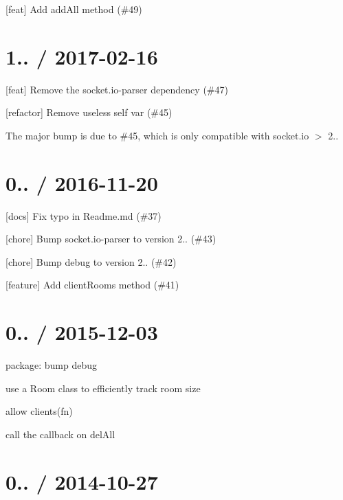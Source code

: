 
\begin{DoxyItemize}
\item \mbox{[}feat\mbox{]} Add add\+All method (\#49)
\end{DoxyItemize}

\section*{1.. / 2017-\/02-\/16 }


\begin{DoxyItemize}
\item \mbox{[}feat\mbox{]} Remove the socket.\+io-\/parser dependency (\#47)
\item \mbox{[}refactor\mbox{]} Remove useless self var (\#45)
\end{DoxyItemize}

The major bump is due to \#45, which is only compatible with socket.\+io $>$ 2..

\section*{0.. / 2016-\/11-\/20 }


\begin{DoxyItemize}
\item \mbox{[}docs\mbox{]} Fix typo in Readme.\+md (\#37)
\item \mbox{[}chore\mbox{]} Bump socket.\+io-\/parser to version 2.. (\#43)
\item \mbox{[}chore\mbox{]} Bump debug to version 2.. (\#42)
\item \mbox{[}feature\mbox{]} Add client\+Rooms method (\#41)
\end{DoxyItemize}

\section*{0.. / 2015-\/12-\/03 }


\begin{DoxyItemize}
\item package\+: bump {\ttfamily debug}
\item use a {\ttfamily Room} class to efficiently track room size
\item allow {\ttfamily clients(fn)}
\item call the callback on {\ttfamily del\+All}
\end{DoxyItemize}

\section*{0.. / 2014-\/10-\/27 }


